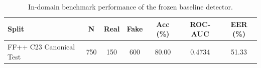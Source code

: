\begin{table}[ht]
\centering\small
\begin{tabular}{lcccccc}
\toprule
Split & N & Real & Fake & Acc (\%) & ROC-AUC & EER (\%) \\
\midrule
FF++ C23 Canonical Test & 750 & 150 & 600 & 80.00 & 0.4734 & 51.33 \\
\bottomrule
\end{tabular}
\caption{In-domain benchmark performance of the frozen baseline detector.}
\label{tab:baseline_results}
\end{table}
